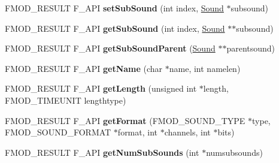 \begin{DoxyCompactItemize}
\item 
\hypertarget{class_f_m_o_d_1_1_sound_ab326892db719b2e98dc0d14b91b0a17c}{F\+M\+O\+D\+\_\+\+R\+E\+S\+U\+L\+T F\+\_\+\+A\+P\+I {\bfseries set\+Sub\+Sound} (int index, \hyperlink{class_f_m_o_d_1_1_sound}{Sound} $\ast$subsound)}\label{class_f_m_o_d_1_1_sound_ab326892db719b2e98dc0d14b91b0a17c}

\item 
\hypertarget{class_f_m_o_d_1_1_sound_ae1f9dd4b19f536a11850961348d6210f}{F\+M\+O\+D\+\_\+\+R\+E\+S\+U\+L\+T F\+\_\+\+A\+P\+I {\bfseries get\+Sub\+Sound} (int index, \hyperlink{class_f_m_o_d_1_1_sound}{Sound} $\ast$$\ast$subsound)}\label{class_f_m_o_d_1_1_sound_ae1f9dd4b19f536a11850961348d6210f}

\item 
\hypertarget{class_f_m_o_d_1_1_sound_a0634bd4977fc537bd7a497aaf380009a}{F\+M\+O\+D\+\_\+\+R\+E\+S\+U\+L\+T F\+\_\+\+A\+P\+I {\bfseries get\+Sub\+Sound\+Parent} (\hyperlink{class_f_m_o_d_1_1_sound}{Sound} $\ast$$\ast$parentsound)}\label{class_f_m_o_d_1_1_sound_a0634bd4977fc537bd7a497aaf380009a}

\item 
\hypertarget{class_f_m_o_d_1_1_sound_a448ce4d402d03d76c79f289565cae2c2}{F\+M\+O\+D\+\_\+\+R\+E\+S\+U\+L\+T F\+\_\+\+A\+P\+I {\bfseries get\+Name} (char $\ast$name, int namelen)}\label{class_f_m_o_d_1_1_sound_a448ce4d402d03d76c79f289565cae2c2}

\item 
\hypertarget{class_f_m_o_d_1_1_sound_a3f0b77ce74332b1f358816eedfc6ca02}{F\+M\+O\+D\+\_\+\+R\+E\+S\+U\+L\+T F\+\_\+\+A\+P\+I {\bfseries get\+Length} (unsigned int $\ast$length, F\+M\+O\+D\+\_\+\+T\+I\+M\+E\+U\+N\+I\+T lengthtype)}\label{class_f_m_o_d_1_1_sound_a3f0b77ce74332b1f358816eedfc6ca02}

\item 
\hypertarget{class_f_m_o_d_1_1_sound_a3b74a166eab897c4b01795aac95eceb1}{F\+M\+O\+D\+\_\+\+R\+E\+S\+U\+L\+T F\+\_\+\+A\+P\+I {\bfseries get\+Format} (F\+M\+O\+D\+\_\+\+S\+O\+U\+N\+D\+\_\+\+T\+Y\+P\+E $\ast$type, F\+M\+O\+D\+\_\+\+S\+O\+U\+N\+D\+\_\+\+F\+O\+R\+M\+A\+T $\ast$format, int $\ast$channels, int $\ast$bits)}\label{class_f_m_o_d_1_1_sound_a3b74a166eab897c4b01795aac95eceb1}

\item 
\hypertarget{class_f_m_o_d_1_1_sound_ade84503ee47f6c08a1116899c4b59ab7}{F\+M\+O\+D\+\_\+\+R\+E\+S\+U\+L\+T F\+\_\+\+A\+P\+I {\bfseries get\+Num\+Sub\+Sounds} (int $\ast$numsubsounds)}\label{class_f_m_o_d_1_1_sound_ade84503ee47f6c08a1116899c4b59ab7}


\end{DoxyCompactItemize}
